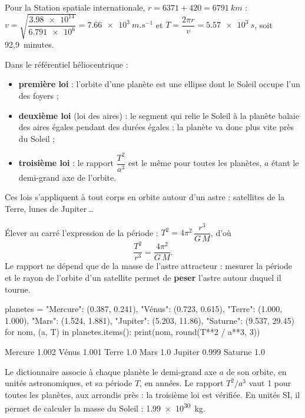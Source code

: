 \begin{exemple}
Pour la Station spatiale internationale, $r=6371+420=\qty{6791}{km}$ :
$v=\sqrt{\dfrac{\num{3.98e14}}{\num{6.791e6}}}=\qty{7,66e3}{m.s^{-1}}$ et $T=\dfrac{2\pi r}{v}=\qty{5,57e3}{s}$, soit 92,9~minutes.
\end{exemple}
\begin{loi}
Dans le référentiel héliocentrique :
\begin{itemize}[leftmargin=1.4em,itemsep=0.1em]
\item \textbf{première loi} : l'orbite d'une planète est une ellipse dont le Soleil occupe l'un des foyers ;
\item \textbf{deuxième loi} (loi des aires) : le segment qui relie le Soleil à la planète balaie des aires égales pendant
des durées égales ; la planète va donc plus vite près du Soleil ;
\item \textbf{troisième loi} : le rapport $\dfrac{T^2}{a^3}$ est le même pour toutes les planètes, $a$ étant le demi-grand axe de
l'orbite.
\end{itemize}
Ces lois s'appliquent à tout corps en orbite autour d'un astre : satellites de la Terre, lunes de Jupiter\,\dots
\end{loi}
\begin{savoirfaire}
Élever au carré l'expression de la période : $T^2=4\pi^2\,\dfrac{r^3}{G\,M}$, d'où
\[\frac{T^2}{r^3}=\frac{4\pi^2}{G\,M}.\]
Le rapport ne dépend que de la masse de l'astre attracteur : mesurer la période et le rayon de l'orbite d'un satellite
permet de \textbf{peser} l'astre autour duquel il tourne.
\end{savoirfaire}
\begin{codecote}[0.6]
\begin{pythoncol}
planetes = {"Mercure": (0.387, 0.241),
            "Vénus":   (0.723, 0.615),
            "Terre":   (1.000, 1.000),
            "Mars":    (1.524, 1.881),
            "Jupiter": (5.203, 11.86),
            "Saturne": (9.537, 29.45)}
for nom, (a, T) in planetes.items():
    print(nom, round(T**2 / a**3, 3))
\end{pythoncol}
\begin{consolecol}
Mercure 1.002
Vénus 1.001
Terre 1.0
Mars 1.0
Jupiter 0.999
Saturne 1.0
\end{consolecol}
\cote
\fontsize{9.5}{12.5}\selectfont
{}\par\smallskip
Le dictionnaire associe à chaque planète le demi-grand axe $a$ de son orbite, en unités astronomiques, et sa période $T$,
en années. Le rapport $T^2/a^3$ vaut 1 pour toutes les planètes, aux arrondis près : la troisième loi est vérifiée. En
unités SI, il permet de calculer la masse du Soleil : \qty{1,99e30}{kg}.
\end{codecote}
